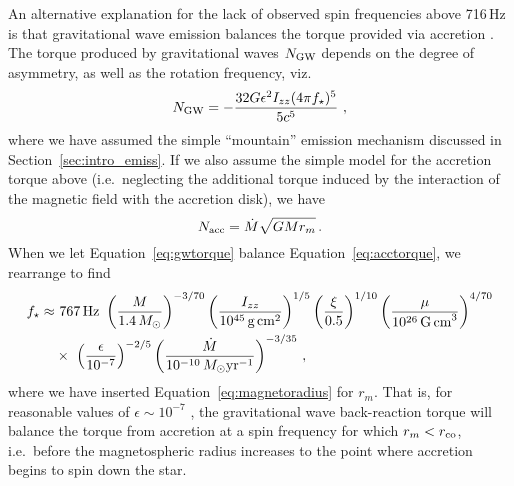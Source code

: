An alternative explanation for the lack of observed spin frequencies above 716\,Hz is that gravitational wave emission balances the torque provided via accretion \citep{Bildsten1998}. The torque produced by gravitational waves $N_{\rm GW}$ depends on the degree of asymmetry, as well as the rotation frequency, viz. \citep{Bildsten1998}
\begin{equation}
    N_{\rm GW} = -\frac{32G \epsilon^2 I_{zz} (4\pi f_\star)^5}{5c^5 }\ , \label{eq:gwtorque}
\end{equation}
where we have assumed the simple ``mountain'' emission mechanism discussed in Section~\ref{sec:intro_emiss}. If we also assume the simple model for the accretion torque above (i.e.~neglecting the additional torque induced by the interaction of the magnetic field with the accretion disk), we have \citep{Ghosh1979a}
\begin{equation}
N_{\rm acc} = \dot{M} \sqrt{GM r_m}\,. \label{eq:acctorque}
\end{equation}
When we let Equation~\eqref{eq:gwtorque} balance Equation~\eqref{eq:acctorque}, we rearrange to find
\begin{align}
    f_\star \approx&~ 767\,\textrm{Hz}\ \left(\frac{M}{1.4\,M_\odot}\right)^{-3/70} 
    \left(\frac{I_{zz}}{10^{45}\,\textrm{g\,cm}^2}\right)^{1/5} 
    \left(\frac{\xi}{0.5}\right)^{1/10}
    \left(\frac{\mu}{10^{26}\,\textrm{G\,cm}^3}\right)^{4/70} \nonumber \\
    &\times\ \left(\frac{\epsilon}{10^{-7}}\right)^{-2/5}
    \left(\frac{\dot{M}}{10^{-10}\,M_\odot\textrm{yr}^{-1}}\right)^{-3/35}\,, \label{eq:fstar_equil}
\end{align}
where we have inserted Equation~\eqref{eq:magnetoradius} for $r_m$. That is, for reasonable values of $\epsilon \sim 10^{-7}$ \citep{Ushomirsky2000,Melatos2005,Haskell2006}, the gravitational wave back-reaction torque will balance the torque from accretion at a spin frequency for which $r_m < r_{\rm co}$, i.e.~before the magnetospheric radius increases to the point where accretion begins to spin down the star.  

